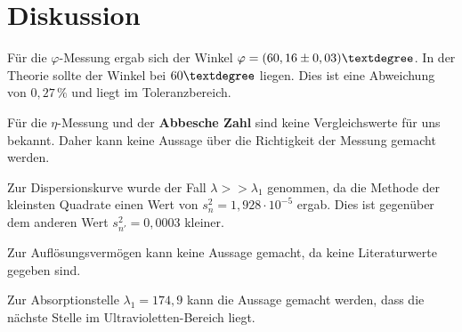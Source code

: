 \section{Diskussion}
Für die $\varphi$-Messung ergab sich der Winkel $\varphi = (60,16\pm0,03)\textdegree$.
In der Theorie sollte der Winkel bei $60 \textdegree$ liegen. Dies ist eine Abweichung
von $0,27 \, \%$ und liegt im Toleranzbereich.\newline

Für die $\eta$-Messung und der \textbf{Abbesche Zahl} sind keine Vergleichswerte
für uns bekannt. Daher kann keine Aussage über die Richtigkeit der Messung gemacht werden.\newline

Zur Dispersionskurve wurde der Fall $\lambda >> \lambda_1$ genommen, da die
Methode der kleinsten Quadrate einen Wert von $s^2_{n} = 1,928 \cdot 10^{-5}$ ergab. Dies
ist gegenüber dem anderen Wert $s^2_{n'} = 0,0003$ kleiner.\newline

Zur Auflösungsvermögen kann keine Aussage gemacht, da keine Literaturwerte gegeben sind.

Zur Absorptionstelle $\lambda_1 = 174,9$ kann die Aussage gemacht werden, dass die
nächste Stelle im Ultravioletten-Bereich liegt.
